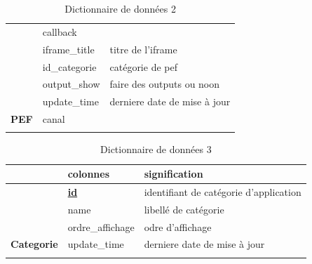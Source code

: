 \begin{longtable}[c]{|c|l|l|}
	& callback                 &                                   \\ \cline{2-3} 
	& iframe\_title            & titre de l'iframe                 \\ \cline{2-3} 
	& id\_categorie            & catégorie de pef                  \\ \cline{2-3} 
	& output\_show             & faire des outputs ou noon         \\ \cline{2-3} 
	& update\_time             & derniere date de mise à jour      \\ \cline{2-3} 
	\multirow{-19}{*}{\textbf{PEF}} & canal                    &                                   \\ \hline
	\captionsetup{justification=centering}
	\caption{Dictionnaire de données 2}
	\label{tab:dictio-2}\\
\end{longtable}

\newpage

\begin{longtable}[c]{|c|l|l|}
	\hline
	\rowcolor[HTML]{C0C0C0} 
	\multicolumn{1}{|l|}{\cellcolor[HTML]{C0C0C0}Classes} & colonnes          & signification                          \\ \hline
	\endhead
	& {\ul \textbf{id}} & identifiant de catégorie d'application \\ \cline{2-3} 
	& name              & libellé de catégorie                   \\ \cline{2-3} 
	& ordre\_affichage  & odre d'affichage                       \\ \cline{2-3} 
	\multirow{-4}{*}{\textbf{Categorie}}                  & update\_time      & derniere date de mise à jour           \\ \hline
	\captionsetup{justification=centering}
	\caption{Dictionnaire de données 3}
	\label{tab:dictio-3}\\
\end{longtable}